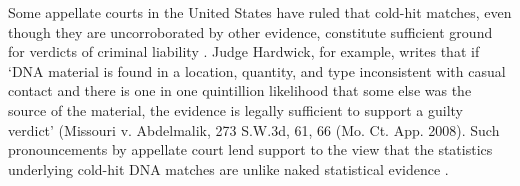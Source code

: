 \documentclass{article}
\begin{document}
 Some appellate courts in the United States have ruled that cold-hit matches, even though they are uncorroborated by other evidence, constitute sufficient ground for verdicts of criminal liability \citep{malcom2008}. Judge Hardwick, for example, writes that if `DNA material is found in a location, quantity, and type inconsistent with casual contact and there is one in one quintillion likelihood that some else was the source of the material, the evidence is legally sufficient to support a guilty verdict' (Missouri v. Abdelmalik, 273 S.W.3d, 61, 66 (Mo. Ct. App. 2008). Such pronouncements by appellate court lend support to the view that the statistics underlying cold-hit DNA matches are unlike naked statistical evidence  \citep{chengeAdNunn2016,dibello2019TrialStatisticsHigh}. 


 
 
 
\end{document}
